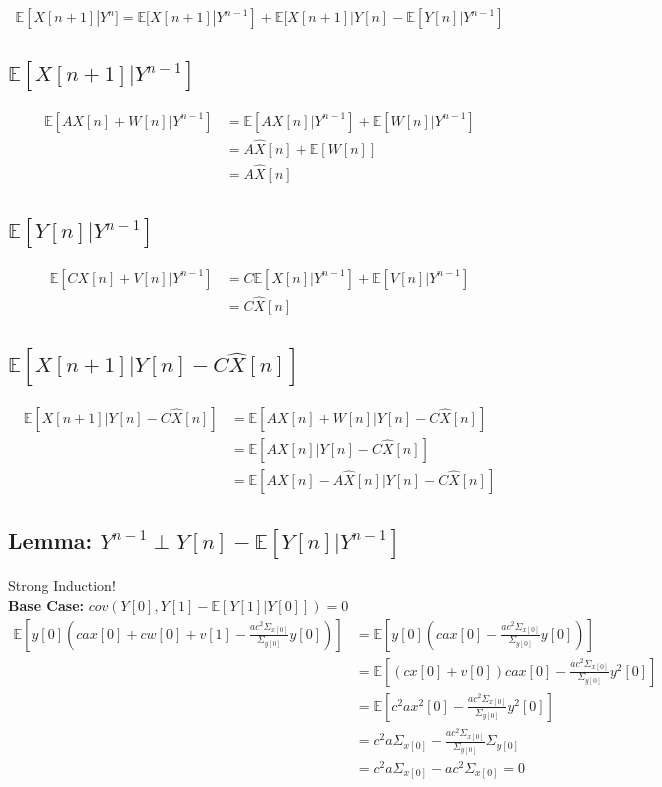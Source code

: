 \documentclass[leqno]{article}
\begin{document}
\[ \mathbb{E}[X[n+1]|Y^n] = \mathbb{E}[X[n+1]|Y^{n-1}]+\mathbb{E}[X[n+1]|Y[n]-\mathbb{E}[Y[n]|Y^{n-1}] \]

\setcounter{equation}{0}
\subsection{$\mathbb{E}[X[n+1]|Y^{n-1}]$}
\begin{align}
\mathbb{E}[AX[n] + W[n]|Y^{n-1}] &= \mathbb{E}[AX[n]|Y^{n-1}] + \mathbb{E}[W[n]|Y^{n-1}]\\
&= A\hat{X}[n] + \mathbb{E}[W[n]]\\
&= A\hat{X}[n]
\end{align}

\subsection{$\mathbb{E}[Y[n]|Y^{n-1}]$}
\begin{align}
\mathbb{E}[CX[n]+V[n]|Y^{n-1}] &= C\mathbb{E}[X[n]|Y^{n-1}] + \mathbb{E}[V[n]|Y^{n-1}]\\
&= C\hat{X}[n]
\end{align}

\subsection{$\mathbb{E}[X[n+1]|Y[n]-C\hat{X}[n]]$}
\begin{align}
\mathbb{E}[X[n+1]|Y[n]-C\hat{X}[n]] &= \mathbb{E}[AX[n]+W[n]|Y[n]-C\hat{X}[n]]\\
&= \mathbb{E}[AX[n]|Y[n]-C\hat{X}[n]]\\
&= \mathbb{E}[AX[n]-A\hat{X}[n]|Y[n]-C\hat{X}[n]]
\end{align}

\subsection*{Lemma: $Y^{n-1} \perp Y[n]-\mathbb{E}[Y[n]|Y^{n-1}]$}
Strong Induction!\\
\textbf{Base Case:} $cov(Y[0],Y[1]-\mathbb{E}[Y[1]|Y[0]])=0$
\setcounter{equation}{0}
\begin{align}
\mathbb{E}[y[0](cax[0]+cw[0]+v[1]-\frac{ac^2\Sigma_{x[0]}}{\Sigma_{y[0]}}y[0])] &= \mathbb{E}[y[0](cax[0]-\frac{ac^2\Sigma_{x[0]}}{\Sigma_{y[0]}}y[0])]\\
&= \mathbb{E}[(cx[0]+v[0])cax[0]-\frac{ac^2\Sigma_{x[0]}}{\Sigma_{y[0]}}y^2[0]]\\
&= \mathbb{E}[c^2ax^2[0]-\frac{ac^2\Sigma_{x[0]}}{\Sigma_{y[0]}}y^2[0]]\\
&= c^2a\Sigma_{x[0]} - \frac{ac^2\Sigma_{x[0]}}{\Sigma_{y[0]}}\Sigma_{y[0]}\\
&= c^2a\Sigma_{x[0]} - ac^2\Sigma_{x[0]} = 0
\end{align}
\end{document}

